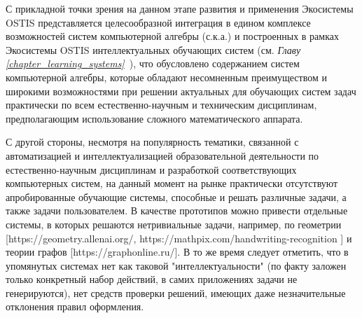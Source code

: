 С прикладной точки зрения на данном этапе развития и применения Экосистемы OSTIS представляется целесообразной интеграция в едином комплексе возможностей систем компьютерной алгебры (с.к.а.) и построенных в рамках Экосистемы OSTIS интеллектуальных обучающих систем (см. \textit{Главу \ref{chapter_learning_systems}~}), что обусловлено содержанием систем компьютерной алгебры, которые обладают несомненным преимуществом и широкими возможностями при решении актуальных для обучающих систем задач практически по всем естественно-научным и техническим дисциплинам, предполагающим использование сложного математического аппарата.

С другой стороны, несмотря на популярность тематики, связанной с автоматизацией и интеллектуализацией образовательной деятельности по естественно-научным дисциплинам и разработкой соответствующих компьютерных систем, на данный момент на рынке практически отсутствуют апробированные  обучающие системы, способные  и решать различные задачи, а также  задачи пользователем. В качестве прототипов можно привести отдельные системы, в которых решаются нетривиальные задачи, например, по геометрии [https://geometry.allenai.org/, https://mathpix.com/handwriting-recognition ] и теории графов [https://graphonline.ru/]. В то же время следует отметить, что в упомянутых системах нет как таковой "интеллектуальности"{} (по факту заложен только конкретный набор действий, в самих приложениях задачи не генерируются), нет средств проверки решений, имеющих даже незначительные отклонения правил оформления.

